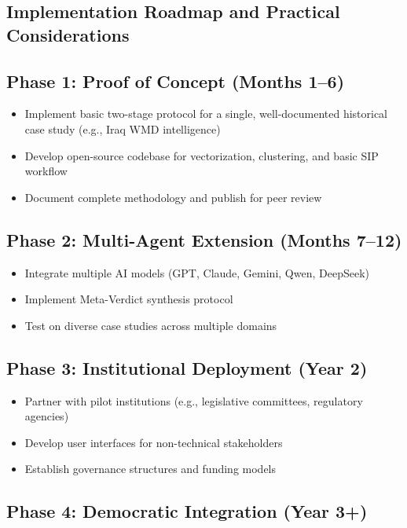 \documentclass[11pt,a4paper]{article}
\begin{document}
\begin{small}
\section{Implementation Roadmap and Practical Considerations}

\subsection{Phase 1: Proof of Concept (Months 1--6)}

\begin{itemize}
    \item Implement basic two-stage protocol for a single, well-documented historical case study (e.g., Iraq WMD intelligence)
    \item Develop open-source codebase for vectorization, clustering, and basic SIP workflow
    \item Document complete methodology and publish for peer review
\end{itemize}

\subsection{Phase 2: Multi-Agent Extension (Months 7--12)}

\begin{itemize}
    \item Integrate multiple AI models (GPT, Claude, Gemini, Qwen, DeepSeek)
    \item Implement Meta-Verdict synthesis protocol
    \item Test on diverse case studies across multiple domains
\end{itemize}

\subsection{Phase 3: Institutional Deployment (Year 2)}

\begin{itemize}
    \item Partner with pilot institutions (e.g., legislative committees, regulatory agencies)
    \item Develop user interfaces for non-technical stakeholders
    \item Establish governance structures and funding models
\end{itemize}

\subsection{Phase 4: Democratic Integration (Year 3+)}


\end{small}
\end{document}
